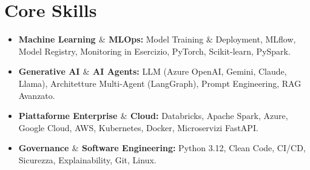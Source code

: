 \documentclass[a4paper,10pt]{article}
\begin{document}
\section{Core Skills}
\begin{itemize}
  \item \textbf{Machine Learning $\&$ MLOps:} Model Training $\&$ Deployment, MLflow, Model Registry, Monitoring in Esercizio, PyTorch, Scikit-learn, PySpark.
  \item \textbf{Generative AI $\&$ AI Agents:} LLM (Azure OpenAI, Gemini, Claude, Llama), Architetture Multi-Agent (LangGraph), Prompt Engineering, RAG Avanzato.
  \item \textbf{Piattaforme Enterprise $\&$ Cloud:} Databricks, Apache Spark, Azure, Google Cloud, AWS, Kubernetes, Docker, Microservizi FastAPI.
  \item \textbf{Governance $\&$ Software Engineering:} Python 3.12, Clean Code, CI/CD, Sicurezza, Explainability, Git, Linux.
\end{itemize}
\end{document}
